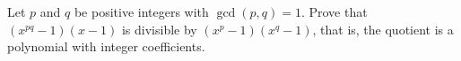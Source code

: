 Let $p$ and $q$ be positive integers with $\gcd(p,q)=1$. Prove that $\left(x^{pq}-1\right)(x-1)$ is divisible by $\left(x^p-1\right)\left(x^q-1\right)$, that is, the quotient is a polynomial with integer coefficients.

